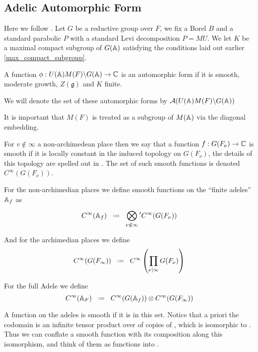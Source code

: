 
\subsection{Adelic Automorphic Form}
Here we follow \cite[I.2.17]{moeglinSpectralDecompositionEisenstein1995}. Let \(G\) be a reductive group over \(F\), we fix a Borel \(B\) and a standard parabolic \(P \) with a standard Levi decomposition \(P = MU\). We let \(K\) be a maximal compact subgroup of \(G(\A)\) satisfying the conditions laid out earlier \ref{max_compact_subgroup}.
\begin{definition}
    A function \(\phi: U(\A)M(F)\backslash G(\A) \to \C\) is an automorphic form if it is smooth, moderate growth, \(Z(\mathfrak{g})\) and \(K\) finite. 

	We will denote the set of these automorphic forms by \(\mathcal{A}(U(\A)M(F)\backslash G(\A))\)
\end{definition}

\begin{remark}
    It is important that \(M(F)\) is treated as a subgroup of \(M(\A)\) via the diagonal embedding.
\end{remark}

For \(v\notin \infty\) a non-archimedean place then we say that a function \(f: G(F_\nu) \to \C\) is smooth if it is locally constant in the induced topology on \(G(F_\nu)\), the details of this topology are spelled out in \cite{conradWeilGrothendieckApproaches2012}. The set of such smooth functions is denoted \(C^\infty(G(F_\nu))\).
	
	For the non-archimedian places we define smooth functions on the ``finite adeles'' \(\A_f\) as 
	\[C^\infty(\mathbb{A}_f) \defeq \bigotimes^{}_{\nu \notin \infty} \phantom{}' C^\infty(G(F_\nu)) \]
	
	And for the archimedian places we define
	\[C^\infty(G(F_\infty)) \defeq C^\infty\left(\prod_{\nu|\infty} G(F_\nu)\right)\]
	
	For the full Adele we define 
	\[C^\infty(\mathbb{A}_F) \defeq   C^\infty(G(\mathbb{A}_f))   \otimes   C^\infty(G(F_\infty))\]
	
	A function on the adeles is smooth if it is in this set. Notice that a priori the codomain is an infinite tensor product over \C of copies of \C, which is isomorphic to \C. Thus we can conflate a smooth function with its composition along this isomorphism, and think of them as functions into \C.

